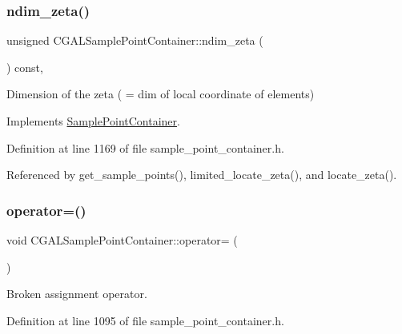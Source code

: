 \subsubsection{\texorpdfstring{ndim\+\_\+zeta()}{ndim\_zeta()}}
{\footnotesize\ttfamily unsigned C\+G\+A\+L\+Sample\+Point\+Container\+::ndim\+\_\+zeta (\begin{DoxyParamCaption}{ }\end{DoxyParamCaption}) const\hspace{0.3cm}{\ttfamily [inline]}, {\ttfamily [virtual]}}



Dimension of the zeta ( = dim of local coordinate of elements) 



Implements \hyperlink{classSamplePointContainer_af2cfee8a92a28addb59a5533dfd138e7}{Sample\+Point\+Container}.



Definition at line 1169 of file sample\+\_\+point\+\_\+container.\+h.



Referenced by get\+\_\+sample\+\_\+points(), limited\+\_\+locate\+\_\+zeta(), and locate\+\_\+zeta().

\mbox{\label{classCGALSamplePointContainer_a69c6087a749139e0f4d575c9d24356a2}} 
\subsubsection{\texorpdfstring{operator=()}{operator=()}}
{\footnotesize\ttfamily void C\+G\+A\+L\+Sample\+Point\+Container\+::operator= (\begin{DoxyParamCaption}\item[{const \hyperlink{classCGALSamplePointContainer}{C\+G\+A\+L\+Sample\+Point\+Container} \&}]{ }\end{DoxyParamCaption})\hspace{0.3cm}{\ttfamily [inline]}}



Broken assignment operator. 



Definition at line 1095 of file sample\+\_\+point\+\_\+container.\+h.



